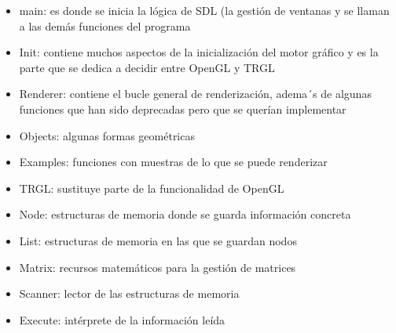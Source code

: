 \begin{itemize}
  \item{main: es donde se inicia la lógica de SDL (la gestión de
      ventanas y se llaman a las demás funciones del programa}
  \item{Init: contiene muchos aspectos de la inicialización del motor
      gráfico y es la parte que se dedica a decidir entre OpenGL y
      TRGL}
  \item{Renderer: contiene el bucle general de renderización, adema´s
      de algunas funciones que han sido deprecadas pero que se querían
      implementar}
  \item{Objects: algunas formas geométricas}
  \item{Examples: funciones con muestras de lo que se puede
      renderizar}
  \item{TRGL: sustituye parte de la funcionalidad de OpenGL}
  \item{Node: estructuras de memoria donde se guarda información concreta}
  \item{List: estructuras de memoria en las que se guardan nodos}
  \item{Matrix: recursos matemáticos para la gestión de matrices}
  \item{Scanner: lector de las estructuras de memoria}
  \item{Execute: intérprete de la información leída}
\end{itemize}